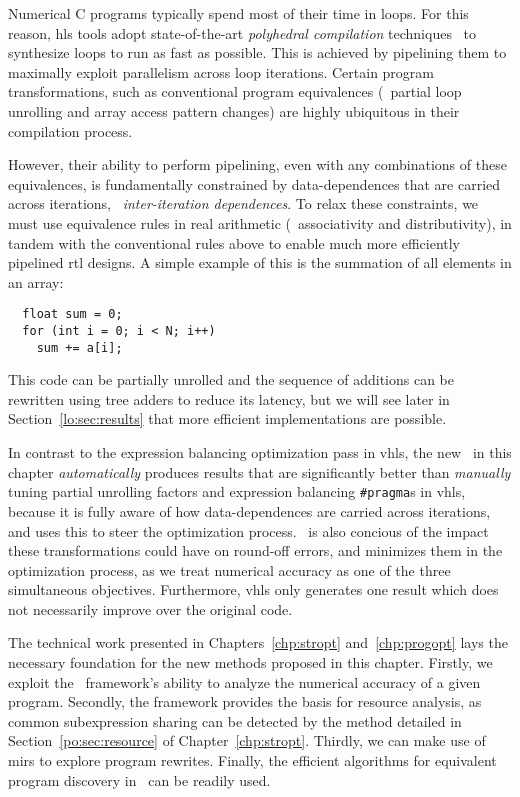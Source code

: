 Numerical C programs typically spend most of their time in loops.  For this
reason, \gls{hls} tools adopt state-of-the-art \emph{polyhedral compilation}
techniques~\cite{canis14} to synthesize loops to run as fast as possible.  This
is achieved by pipelining them to maximally exploit parallelism across loop
iterations.  Certain program transformations, such as conventional program
equivalences (\eg~partial loop unrolling and array access pattern changes) are
highly ubiquitous in their compilation process.

However, their ability to perform pipelining, even with any combinations of
these equivalences, is fundamentally constrained by data-dependences that
are carried across iterations, \ie~\emph{inter-iteration dependences}.  To
relax these constraints, we must use equivalence rules in real arithmetic
(\eg~associativity and distributivity), in tandem with the conventional rules
above to enable much more efficiently pipelined \gls{rtl} designs.  A simple
example of this is the summation of all elements in an array:
\begin{lstlisting}
  float sum = 0;
  for (int i = 0; i < N; i++)
    sum += a[i];
\end{lstlisting}
This code can be partially unrolled and the sequence of additions can be
rewritten using tree adders to reduce its latency, but we will see later in
Section~\ref{lo:sec:results} that more efficient implementations are possible.

In contrast to the expression balancing optimization pass in \gls{vhls}, the
new \soap~in this chapter \emph{automatically} produces results that are
significantly better than \emph{manually} tuning partial unrolling factors
and expression balancing \verb|#pragma|s in \gls{vhls}, because it is fully
aware of how data-dependences are carried across iterations, and uses this
to steer the optimization process. \soap~is also concious of the impact
these transformations could have on round-off errors, and minimizes them in
the optimization process, as we treat numerical accuracy as one of the three
simultaneous objectives.  Furthermore, \gls{vhls} only generates one result
which does not necessarily improve over the original code.

The technical work presented in Chapters~\ref{chp:stropt} and~\ref{chp:progopt}
lays the necessary foundation for the new methods proposed in this chapter.
Firstly, we exploit the \soap~framework's ability to analyze the numerical
accuracy of a given program.  Secondly, the framework provides the basis for
resource analysis, as common subexpression sharing can be detected by the
method detailed in Section~\ref{po:sec:resource} of Chapter~\ref{chp:stropt}.
Thirdly, we can make use of \glspl{mir} to explore program rewrites.  Finally,
the efficient algorithms for equivalent program discovery in \soap~can be
readily used.

